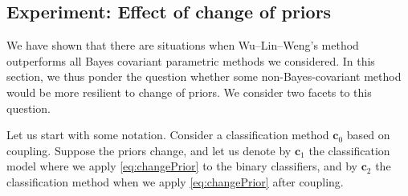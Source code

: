 \documentclass[pdflatex, sn-basic]{sn-jnl}%
\theoremstyle{thmstyleone}%
\theoremstyle{thmstyletwo}%
\theoremstyle{thmstylethree}%
\begin{document}
%
%
%
%
%
%
%
%

\subsection{Experiment: Effect of change of priors}  \label{sec:exp4}

We have shown that there are situations when Wu--Lin--Weng's method outperforms
all Bayes covariant parametric methods we considered. 
In this section, we thus ponder 
the question whether some non-Bayes-covariant method would be more resilient to change of priors. We consider two facets to this question.

Let us start with some notation. Consider a classification method $\boldsymbol{c}_0$ based on coupling. Suppose the priors change, and let us denote by $\boldsymbol{c}_1$ the classification model where we apply \eqref{eq:changePrior} to the binary classifiers, and by $\boldsymbol{c}_2$ the classification method when we apply \eqref{eq:changePrior} after coupling. 
\end{document}
